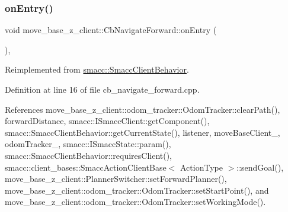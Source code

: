 \subsubsection{\texorpdfstring{on\+Entry()}{onEntry()}}
{\footnotesize\ttfamily void move\+\_\+base\+\_\+z\+\_\+client\+::\+Cb\+Navigate\+Forward\+::on\+Entry (\begin{DoxyParamCaption}{ }\end{DoxyParamCaption})\hspace{0.3cm}{\ttfamily [override]}, {\ttfamily [virtual]}}



Reimplemented from \hyperlink{classsmacc_1_1SmaccClientBehavior_a7962382f93987c720ad432fef55b123f}{smacc\+::\+Smacc\+Client\+Behavior}.



Definition at line 16 of file cb\+\_\+navigate\+\_\+forward.\+cpp.



References move\+\_\+base\+\_\+z\+\_\+client\+::odom\+\_\+tracker\+::\+Odom\+Tracker\+::clear\+Path(), forward\+Distance, smacc\+::\+I\+Smacc\+Client\+::get\+Component(), smacc\+::\+Smacc\+Client\+Behavior\+::get\+Current\+State(), listener, move\+Base\+Client\+\_\+, odom\+Tracker\+\_\+, smacc\+::\+I\+Smacc\+State\+::param(), smacc\+::\+Smacc\+Client\+Behavior\+::requires\+Client(), smacc\+::client\+\_\+bases\+::\+Smacc\+Action\+Client\+Base$<$ Action\+Type $>$\+::send\+Goal(), move\+\_\+base\+\_\+z\+\_\+client\+::\+Planner\+Switcher\+::set\+Forward\+Planner(), move\+\_\+base\+\_\+z\+\_\+client\+::odom\+\_\+tracker\+::\+Odom\+Tracker\+::set\+Start\+Point(), and move\+\_\+base\+\_\+z\+\_\+client\+::odom\+\_\+tracker\+::\+Odom\+Tracker\+::set\+Working\+Mode().


